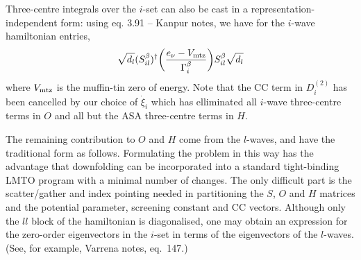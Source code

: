 Three-centre integrals over the $i$-set can also be cast in a
representation-independent form: using eq. 3.91 -- Kanpur notes, we
have for the $i$-wave hamiltonian entries,
$$\sqrt{d_l}(S^\beta_{il})^\dagger
\biggl({e_\nu-V_{\rm mtz}\over\Gamma^\beta_i}\biggr)
S^\beta_{il}\sqrt{d_l}$$
where $V_{\rm mtz}$ is the muffin-tin zero of energy.
Note that the CC term in $D^{(2)}_i$ has been cancelled by our choice of
$\dot\xi_i$ which has elliminated all $i$-wave three-centre terms in $O$
and all but the ASA three-centre terms in $H$.

The remaining contribution to $O$ and $H$ come from the $l$-waves, and
have the traditional form as follows.
\vskip 5pt
\vskip2pt
\vskip2pt
\vskip2pt
\vskip 5pt
\vskip2pt
\vskip2pt
\vskip2pt
\vskip 5pt
\vskip2pt
\vskip2pt
\vskip2pt
\vskip 5pt
\vskip2pt
\vskip2pt
\vskip2pt
\vskip5pt
Formulating the problem in this way has the advantage that downfolding
can be incorporated into a standard tight-binding LMTO program with a
minimal number of changes. The only difficult part is the scatter/gather
and index pointing needed in partitioning the $S$, $O$ and $H$ matrices and
the potential parameter, screening constant and CC vectors.
\vskip 10pt
\nobreak\vskip 5pt\nobreak
Although only the $ll$ block of the hamiltonian is diagonalised, one
may obtain an expression for the zero-order eigenvectors in the $i$-set
in terms of the eigenvectors of the $l$-waves. (See, for example,
Varrena notes, eq.~147.)
